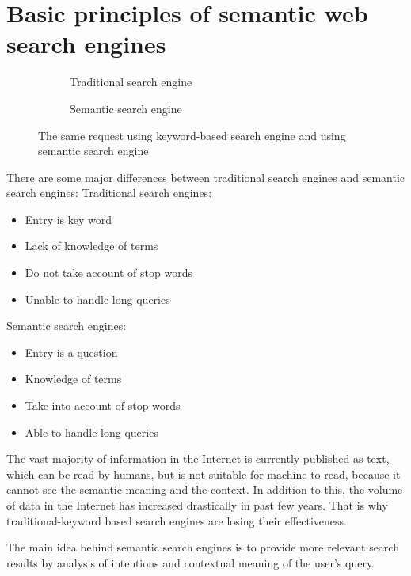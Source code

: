 \documentclass[10pt,twoside,a4paper]{article}
\begin{document}
\section{Basic principles of semantic web search engines}
\begin{figure}[h!]
  \centering
  \begin{subfigure}
    \texttt{[image: s1.png]}
    \caption{Traditional search engine}
  \end{subfigure}
  \begin{subfigure}
    \texttt{[image: 1.png]}
    \caption{Semantic search engine}
  \end{subfigure}
  \caption{The same request using keyword-based search engine and using semantic search engine }
  \label{fig:coffee}
\end{figure}
There are some major differences between traditional search engines and semantic search engines:
Traditional search engines:
\begin{itemize}
    \item Entry is key word
    \item Lack of knowledge of terms
    \item Do not take account of stop words
    \item Unable to handle long queries
\end{itemize}

Semantic search engines:

\begin{itemize}
    \item Entry is a question
    \item Knowledge of terms
    \item Take into account of stop words
    \item Able to handle long queries
\end{itemize}\cite{intr}







The vast majority of information in the Internet is currently published as text, which can be read by humans, but is not suitable for machine to read, because it cannot see the semantic meaning and the context. In addition to this, the volume of data in the Internet has increased drastically in past few years. That is why traditional-keyword based search engines are losing their effectiveness.

The main idea behind semantic search engines is to provide more relevant search results by analysis of intentions and contextual meaning of the user's query.
\end{document}
